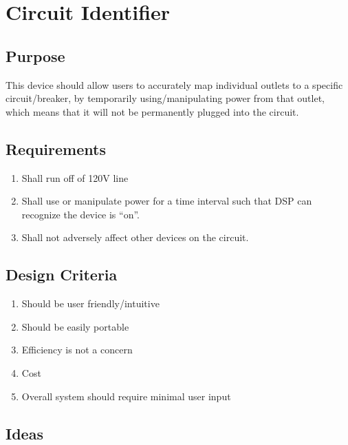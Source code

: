 \section{Circuit Identifier}
\subsection{Purpose}
This device should allow users to accurately map individual outlets to a specific circuit/breaker, by temporarily using/manipulating power from that outlet, which means that it will not be permanently plugged into the circuit.
\subsection{Requirements}
\begin{enumerate}
   \item Shall run off of 120V line
   \item Shall use or manipulate power for a time interval such that DSP can recognize the device is ``on''.
   \item Shall not adversely affect other devices on the circuit.
\end{enumerate}

\subsection{Design Criteria}
\begin{enumerate}
\item Should be user friendly/intuitive
\item Should be easily portable
\item Efficiency is not a concern
\item Cost
\item Overall system should require minimal user input
\end{enumerate}

\subsection{Ideas}
